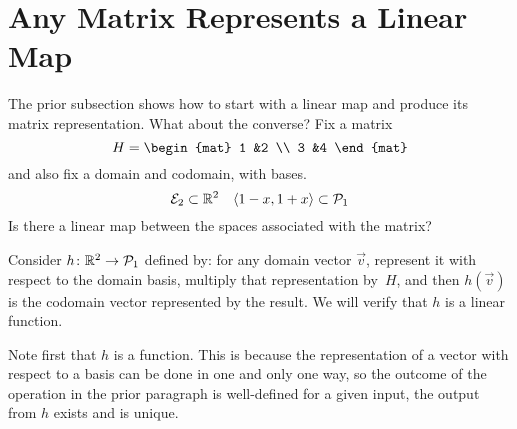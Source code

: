 \documentclass[10pt,t]{beamer}
\begin{document}
\section{Any Matrix Represents a Linear Map}
\begin{frame}
The prior subsection shows how to start with a linear map and produce its matrix
representation.
What about the converse?
\ex
Fix a matrix
\begin{equation*}
  H=\begin{mat}
    1 &2 \\
    3 &4
  \end{mat}
\end{equation*}
and also fix a domain and codomain, with bases.
\begin{equation*}
  {\cal E}_2\subset\mathbb{R}^2
  \quad
  \langle1-x,1+x\rangle\subset\mathcal{P}_1
\end{equation*}
Is there a linear map between the spaces associated with the matrix?

\pause
Consider $\mbox{$h\colon \mathbb{R}^2\to \mathcal{P}_1$}$ defined by:
for any domain vector $\vec{v}$, represent it with respect to the domain basis,
multiply that representation by~$H$, 
and then $h(\vec{v})$ is the codomain vector represented by
the result.
We will verify that $h$ is a linear function.

\pause
Note first that $h$ is a function.
This is because
the representation of a vector with respect to a basis can be done in
one and only one way, so the outcome of the operation in the prior paragraph
is well-defined\Dash 
for a given input, the output from $h$ exists and is unique. 
\end{frame}
\end{document}
